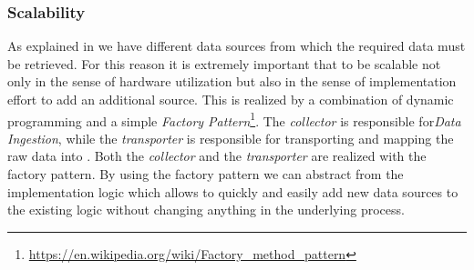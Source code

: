 \subsubsection{Scalability}
\label{subsubsec:scale}
As explained in  we have different data sources from which the required data must be retrieved.
For this reason it is extremely important that to be  scalable not only in the sense of hardware utilization but also in the sense of implementation effort to add an additional source.
\newline
This is realized by a combination of dynamic programming and a simple \textit{Factory Pattern}\footnote{\url{https://en.wikipedia.org/wiki/Factory_method_pattern}}.%
\newline
The \textit{collector} is responsible for\textit{Data Ingestion}, while the \textit{transporter} is responsible for transporting and mapping the raw data into \pg{}. Both the \textit{collector} and the \textit{transporter} are realized with the factory pattern. By using the factory pattern we can abstract from the implementation logic which allows to quickly and easily add new data sources to the existing logic without changing anything in the underlying process.
%
